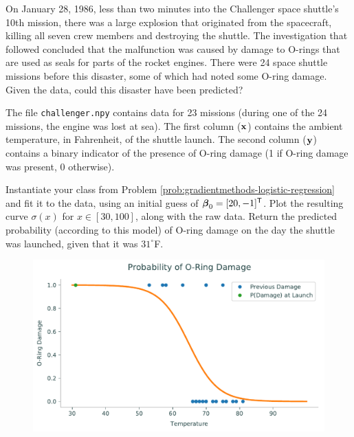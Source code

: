 \begin{problem}
On January 28, 1986, less than two minutes into the Challenger space shuttle's 10th mission, there was a large explosion that originated from the spacecraft, killing all seven crew members and destroying the shuttle.
The investigation that followed concluded that the malfunction was caused by damage to O-rings that are used as seals for parts of the rocket engines.
There were 24 space shuttle missions before this disaster, some of which had noted some O-ring damage.
Given the data, could this disaster have been predicted?

The file \texttt{challenger.npy} contains data for 23 missions (during one of the 24 missions, the engine was lost at sea).
The first column ($\mathbf{x}$) contains the ambient temperature, in Fahrenheit, of the shuttle launch.
The second column ($\mathbf{y}$) contains a binary indicator of the presence of O-ring damage (1 if O-ring damage was present, 0 otherwise).

Instantiate your class from Problem \ref{prob:gradientmethods-logistic-regression} and fit it to the data, using an initial guess of $\boldsymbol{\beta}_0 = [20, -1]^{\mathsf T}$.
Plot the resulting curve $\sigma(x)$ for $x \in [30, 100]$, along with the raw data.
Return the predicted probability (according to this model) of O-ring damage on the day the shuttle was launched, given that it was $31^\circ$F.

\begin{figure}[H]
\centering
    \includegraphics[width=.7\textwidth]{figures/logreg.pdf}
    \label{fig:logistic_curve}
\end{figure}
\end{problem}

